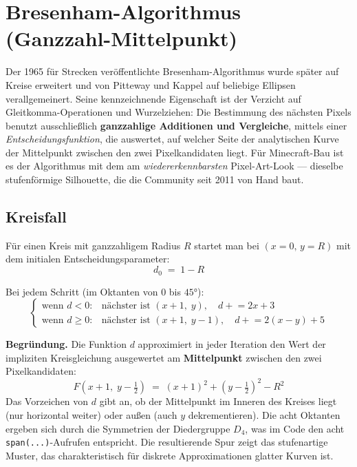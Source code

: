 \documentclass[12pt,a4paper]{scrartcl}
\newcommand{\code}[1]{\texttt{\small #1}}
\newcommand{\acc}[1]{\textcolor{accent}{\textbf{#1}}}
\begin{document}
\section{Bresenham-Algorithmus (Ganzzahl-Mittelpunkt)}

Der 1965 für Strecken veröffentlichte Bresenham-Algorithmus wurde später auf Kreise erweitert und von Pitteway und Kappel auf beliebige Ellipsen verallgemeinert. Seine kennzeichnende Eigenschaft ist der Verzicht auf Gleitkomma-Operationen und Wurzelziehen: Die Bestimmung des nächsten Pixels benutzt ausschließlich \acc{ganzzahlige Additionen und Vergleiche}, mittels einer \emph{Entscheidungsfunktion}, die auswertet, auf welcher Seite der analytischen Kurve der Mittelpunkt zwischen den zwei Pixelkandidaten liegt. Für Minecraft-Bau ist es der Algorithmus mit dem am \emph{wiedererkennbarsten} Pixel-Art-Look --- dieselbe stufenförmige Silhouette, die die Community seit 2011 von Hand baut.

\subsection{Kreisfall}

Für einen Kreis mit ganzzahligem Radius $R$ startet man bei $(x{=}0,\,y{=}R)$ mit dem initialen Entscheidungsparameter:
\[
d_0 \;=\; 1 - R
\]

Bei jedem Schritt (im Oktanten von $0$ bis $45°$):
\[
\begin{cases}
\text{wenn } d < 0: & \text{nächster ist } (x{+}1,\;y), \quad d \mathrel{+}= 2x+3 \\[2pt]
\text{wenn } d \geq 0: & \text{nächster ist } (x{+}1,\;y{-}1), \quad d \mathrel{+}= 2(x-y)+5
\end{cases}
\]

\textbf{Begründung.} Die Funktion $d$ approximiert in jeder Iteration den Wert der impliziten Kreisgleichung ausgewertet am \acc{Mittelpunkt} zwischen den zwei Pixelkandidaten:
\[
F\!\left(x+1,\;y-\tfrac{1}{2}\right) \;=\; (x+1)^2 + \left(y-\tfrac{1}{2}\right)^{\!2} - R^2
\]
Das Vorzeichen von $d$ gibt an, ob der Mittelpunkt im Inneren des Kreises liegt (nur horizontal weiter) oder außen (auch $y$ dekrementieren). Die acht Oktanten ergeben sich durch die Symmetrien der Diedergruppe $D_4$, was im Code den acht \code{span(...)}-Aufrufen entspricht. Die resultierende Spur zeigt das stufenartige Muster, das charakteristisch für diskrete Approximationen glatter Kurven ist.
\end{document}
